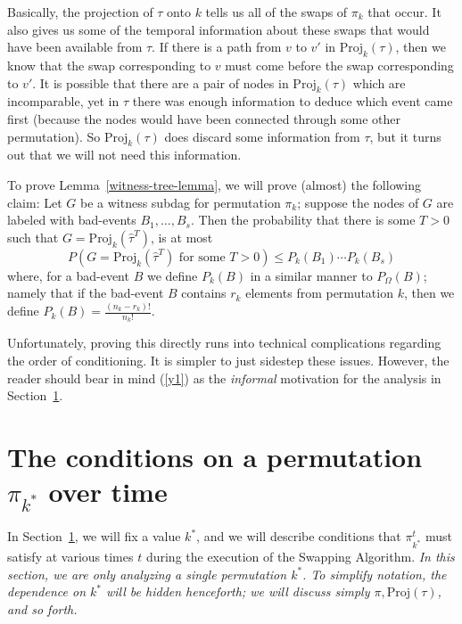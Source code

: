 Basically, the projection of $\tau$ onto $k$ tells us all of the swaps of $\pi_k$ that occur. It also gives us some of the temporal information about these swaps that would have been available from $\tau$. If there is a path from $v$ to $v'$ in $\text{Proj}_k(\tau)$, then we know that the swap corresponding to $v$ must come before the swap corresponding to $v'$. It is possible that there are a pair of nodes in $\text{Proj}_k(\tau)$ which are incomparable, yet in $\tau$ there was enough information to deduce which event came first (because the nodes would have been connected through some other permutation). So $\text{Proj}_k(\tau)$ does discard some information from $\tau$, but it turns out that we will not need this information.

To prove Lemma~\ref{witness-tree-lemma}, we will prove (almost) the following claim: Let $G$ be a witness subdag for permutation $\pi_k$; suppose the nodes of $G$ are labeled with bad-events $B_1, \dots, B_s$. Then the probability that there is some $T > 0$ such that $G = \text{Proj}_k(\hat \tau^T)$, is at most
\begin{equation}
\label{y1}
P(\text{$G = \text{Proj}_k(\hat \tau^T)$ for some $T > 0$}) \leq P_k(B_1) \cdots P_k(B_s)
\end{equation}
where, for a bad-event $B$ we define $P_k(B)$ in a similar manner to $P_{\Omega}(B)$; namely that if the bad-event $B$ contains $r_k$ elements from permutation $k$, then we define $P_k(B) = \frac{(n_k - r_k)!}{n_k!}$.

Unfortunately, proving this directly runs into technical complications regarding the order of conditioning. It is simpler to just sidestep these issues. However, the reader should bear in mind (\ref{y1}) as the \emph{informal} motivation for the analysis in Section~\ref{perm-conditions}.

\section{The conditions on a permutation $\pi_{k^*}$ over time}
\label{perm-conditions}
In Section~\ref{perm-conditions}, we will fix a value $k^*$, and we will describe conditions that $\pi_{k^*}^t$ must satisfy at various times $t$ during the execution of the Swapping Algorithm. \emph{In this section, we are only analyzing a single permutation $k^*$. To simplify notation, the dependence on $k^*$ will be hidden henceforth; we will discuss simply $\pi, \text{Proj}(\tau)$, and so forth. }

